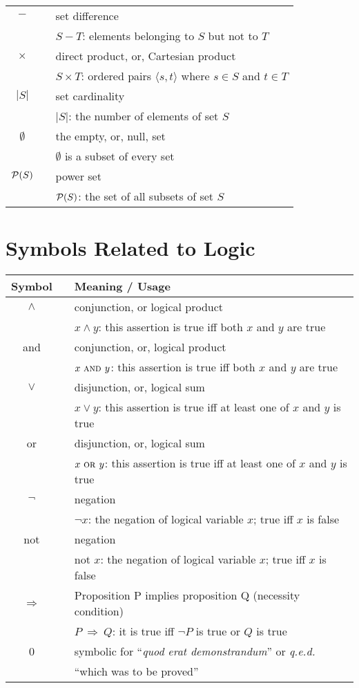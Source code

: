 \begin{tabular}{c|cl}
$-$
  & & set difference \\ 
  & & $S - T$: elements belonging to $S$ but not to $T$ \\ \hline
$\times$
  & & direct product, or, Cartesian product \\
  & & $S \times T$: ordered pairs $\langle s,t \rangle$ where $s \in S$ and $t \in T$ \\ \hline
$|S|$
  & & set cardinality \\
  & & $|S|$: the number of elements of set $S$ \\ \hline
$\emptyset$
  & & the empty, or, null, set \\
  & & $\emptyset$ is a subset of every set \\ \hline
$\mbox{$\cal P$}(S)$
  & & power set \\
  & & $\mbox{$\cal P$}(S)$: the set of all subsets of set $S$ \\ \hline
\end{tabular}

\section*{Symbols Related to Logic}

\begin{tabular}{c|cl}
{\bf Symbol} & & {\bf Meaning} / {\bf Usage} \\ \hline
\hline
$\wedge$
  & & conjunction, or logical product \\
  & & $x \wedge y$: this assertion is true iff both $x$ and $y$ are true \\
{\sc and}
  & & conjunction, or, logical product \\
  & & $x \ \mbox{\sc and } y$: this assertion is true iff both $x$ and $y$ are true \\ \hline
$\vee$
  & & disjunction, or, logical sum \\
  & & $x \vee y$:  this assertion is true iff at least one of $x$ and $y$ is true \\
{\sc or}
  & & disjunction, or, logical sum \\
  & & $x \ \mbox{\sc or } y$:  this assertion is true iff at least one of $x$ and $y$ is true  \\ \hline
$\neg$
  & & negation \\
  & & $\neg x$: the negation of logical variable $x$; true iff $x$ is false \\ 
{\sc not}
  & & negation \\
    & & {\sc not}  $x$: the negation of logical variable $x$; true iff $x$ is false \\ \hline
$ \Rightarrow $
  & & Proposition P implies proposition Q (necessity condition) \\
  & & $P \ \Rightarrow \ Q$: it is true iff $\neg P$ is true or $ Q$ is true  \\ \hline
\qed
  & & symbolic for ``{\em quod erat demonstrandum}'' or {\em q.e.d.} \\
  & & ``which was to be proved'' \\
\hline 
\end{tabular}

